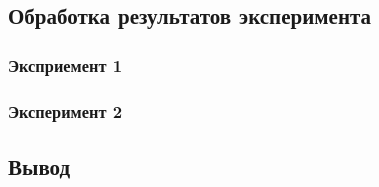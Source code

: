 \documentclass{article}
\begin{document}
\subsection*{Обработка результатов эксперимента}

\subsubsection*{Эксприемент 1}


\subsubsection*{Эксперимент 2}




\subsection*{Вывод}
\end{document}
